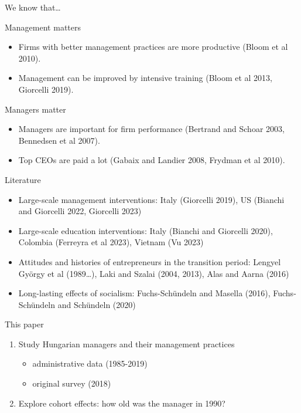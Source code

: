 \documentclass[
  ignorenonframetext,
  aspectratio=1610,
]{beamer}
\providecommand{\tightlist}{%
  \setlength{\itemsep}{0pt}\setlength{\parskip}{0pt}}
\begin{document}
\begin{frame}{We know that\ldots{}}
\protect\hypertarget{we-know-that}{}
\begin{block}{Management matters}
\protect\hypertarget{management-matters}{}
\begin{itemize}
\tightlist
\item
  Firms with better management practices are more productive (Bloom et
  al 2010).
\item
  Management can be improved by intensive training (Bloom et al 2013,
  Giorcelli 2019).
\end{itemize}
\end{block}

\begin{block}{Managers matter}
\protect\hypertarget{managers-matter}{}
\begin{itemize}
\tightlist
\item
  Managers are important for firm performance (Bertrand and Schoar 2003,
  Bennedsen et al 2007).
\item
  Top CEOs are paid a lot (Gabaix and Landier 2008, Frydman et al 2010).
\end{itemize}
\end{block}
\end{frame}

\begin{frame}{Literature}
\protect\hypertarget{literature}{}
\begin{itemize}
\tightlist
\item
  Large-scale management interventions: Italy (Giorcelli 2019), US
  (Bianchi and Giorcelli 2022, Giorcelli 2023)
\item
  Large-scale education interventions: Italy (Bianchi and Giorcelli
  2020), Colombia (Ferreyra et al 2023), Vietnam (Vu 2023)
\item
  Attitudes and histories of entrepreneurs in the transition period:
  Lengyel György et al (1989\ldots), Laki and Szalai (2004, 2013), Alas
  and Aarna (2016)
\item
  Long-lasting effects of socialism: Fuchs-Schündeln and Masella (2016),
  Fuchs-Schündeln and Schündeln (2020)
\end{itemize}
\end{frame}

\begin{frame}{This paper}
\protect\hypertarget{this-paper}{}
\begin{enumerate}
\tightlist
\item
  Study Hungarian managers and their management practices

  \begin{itemize}
  \tightlist
  \item
    administrative data (1985-2019)
  \item
    original survey (2018)
  \end{itemize}
\item
  Explore cohort effects: how old was the manager in 1990?
\end{enumerate}
\end{frame}
\end{document}
